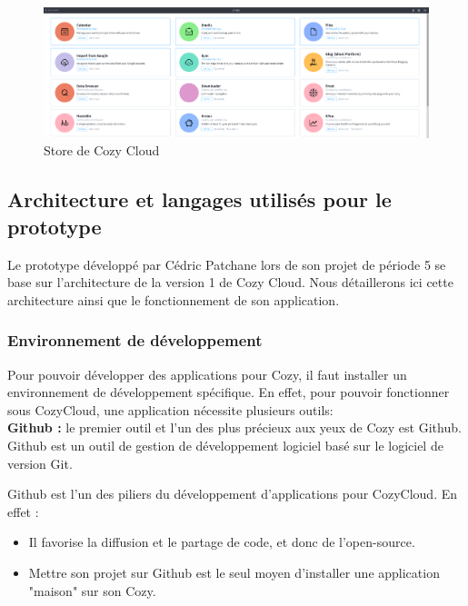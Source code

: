 \begin{figure}[!ht]
\begin{center}
\includegraphics[scale = 0.3]{img/store.png}
\end{center}
\caption{Store de Cozy Cloud}
\end{figure}

\subsection{Architecture et langages utilisés pour le prototype}

Le prototype développé par Cédric Patchane lors de son projet de période 5 se base sur l'architecture de la version 1 de Cozy Cloud. Nous détaillerons ici cette architecture ainsi que le fonctionnement de son application. 

\subsubsection{Environnement de développement}

Pour pouvoir développer des applications pour Cozy, il faut installer un environnement de développement spécifique. En effet, pour pouvoir fonctionner sous CozyCloud, une application nécessite plusieurs outils:\\ 

\textbf{Github :} le premier outil et l'un des plus précieux aux yeux de Cozy est Github. 
Github est un outil de gestion de développement logiciel basé sur le logiciel de version Git. 

Github est l'un des piliers du développement d'applications pour CozyCloud. En effet :

\begin{itemize}
    \item Il favorise la diffusion et le partage de code, et donc de l'open-source.
    \item Mettre son projet sur Github est le seul moyen d'installer une application "maison" sur son Cozy. \\
\end{itemize}


